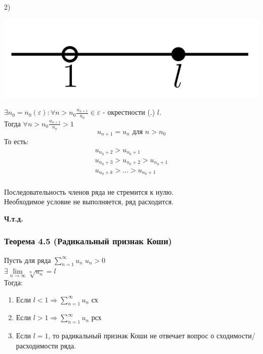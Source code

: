 \documentclass[12pt]{article}
\let\ORIincludegraphics\includegraphics
\renewcommand{\includegraphics}[2][]{\ORIincludegraphics[scale=0.65,#1]{#2}}
\let\oldsum\sum
\let\oldlim\lim
\renewcommand{\sum}{\oldsum\limits}
\renewcommand{\lim}{\oldlim\limits}
\begin{document}
\begin{adjustwidth}{1.5em}{1.5em}
    \begin{minipage}{0.1\textwidth}
      2)
    \end{minipage}
    \hspace{1em}
    \begin{minipage}{0.55\textwidth}
      \includegraphics[scale=0.6]{10.4.3.png}      
    \end{minipage}
    \vspace{1em}
    \par

    $\exists n_0=n_0(\varepsilon): \forall n>n_0 \frac{u_{n+1}}{u_n} \in \varepsilon$ - окрестности (.) $l$.\\
    Тогда $\forall n > n_0 \frac{u_{n+1}}{u_n}>1$\\
    \[u_{n+1}=u_n \text{ для } n>n_0\]
    То есть: 
    \[\begin{matrix}
      u_{n_0+2}>u_{n_0+1}\\
    u_{n_0+3}>u_{n_0+2}>u_{n_0+1}\\
    u_{n_0+k}>\dots>u_{n_0+1}\\
    \end{matrix}\]

    Последовательность членов ряда не стремится к нулю.\\
    Необходимое условие не выполняется, ряд расходится.\\
    \begin{center}
      \textbf{Ч.т.д.}
    \end{center}
  \end{adjustwidth}

  \subsubsection*{Теорема 4.5 (Радикальный признак Коши)}\label{th:10.4.5}
  \par\noindent
  Пусть для ряда $\sum_{n=1}^{\infty} u_n \; u_n>0$\\
  $\exists \lim_{n \to \infty} \sqrt[n]{u_n}=l$\\
  Тогда:
  \begin{enumerate}
    \item Если $l<1 \Rightarrow \sum_{n=1}^{\infty} u_n$ сх\\
    \item Если $l>1 \Rightarrow \sum_{n=1}^{\infty} u_n$ рсх\\
    \item Если $l=1$, то радикальный признак Коши не отвечает вопрос о сходимости/расходимости ряда. 
  \end{enumerate}
  
\end{document}
